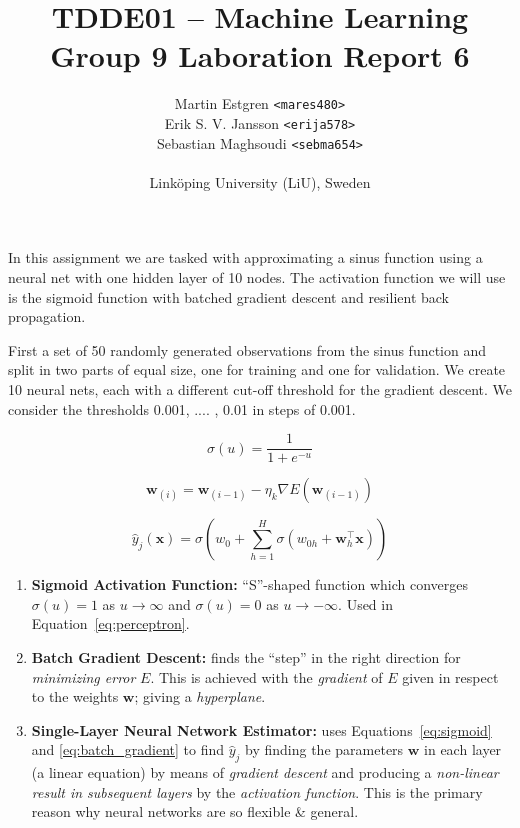 \documentclass[a4paper, twocolumn]{article}
\title{TDDE01 -- Machine Learning \\
Group 9 Laboration Report 6}
\author{{Martin Estgren \texttt{<mares480>}} \\
{Erik S. V. Jansson \texttt{<erija578>}} \\
{Sebastian Maghsoudi \texttt{<sebma654>}} \\~\\
{Linköping University (LiU), Sweden}}
\begin{document}
    \maketitle %
    
    In this assignment we are tasked with approximating a sinus function using a neural net with one hidden layer of 10 nodes. The activation function we will use is the sigmoid function with batched gradient descent and resilient back propagation. 

    

    First a set of 50 randomly generated observations from the sinus function and split in two parts of equal size, one for training and one for validation. We create 10 neural nets, each with a different cut-off threshold for the gradient descent. We consider the thresholds 0.001, .... , 0.01 in steps of 0.001. 

    

    \begin{equation} \label{eq:sigmoid}
        \sigma(u) = \frac{1}{1 + e^{-u}}
    \end{equation}

    \begin{equation} \label{eq:batch_gradient}
        \bm{w}_{(i)} = \bm{w}_{(i-1)} - \eta_k \nabla E(\bm{w}_{(i-1)})
    \end{equation}

    \begin{equation} \label{eq:perceptron}
        \hat{y}_j(\bm{x}) = \sigma(w_0 + \sum_{h=1}^{H} \sigma(w_{0h} + \bm{w}_h^\intercal\bm{x}))
    \end{equation}

    \begin{enumerate}
        \item{\textbf{Sigmoid Activation Function:} ``S''-shaped function which converges $\sigma(u) = 1$ as $u \to \infty$ and $\sigma(u) = 0$ as $u \to -\infty$. Used in Equation~\ref{eq:perceptron}.}
        \item{\textbf{Batch Gradient Descent:} finds the ``step'' in the right direction for \emph{minimizing error} $E$. This is achieved with the \emph{gradient} of $E$ given in respect to the weights $\bm{w}$; giving a \emph{hyperplane}.}
        \item{\textbf{Single-Layer Neural Network Estimator:} uses Equations~\ref{eq:sigmoid} and \ref{eq:batch_gradient} to find $\hat{y}_j$ by finding the parameters $\bm{w}$ in each layer (a linear equation) by means of \emph{gradient descent} and producing a \emph{non-linear result in subsequent layers} by the \emph{activation function}. This is the primary reason why neural networks are so flexible \& general.}
    \end{enumerate}
\end{document}
